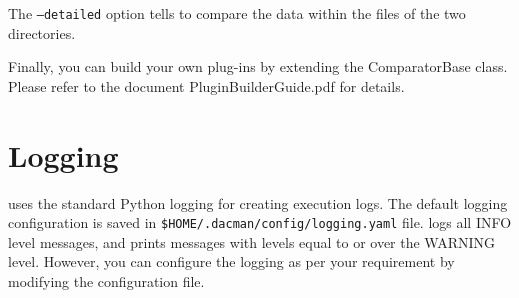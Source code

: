 The \texttt{--detailed} option tells \systemname to compare the data
within the files of the two directories.

Finally, you can build your own plug-ins by extending the ComparatorBase
class. Please refer to the document PluginBuilderGuide.pdf for details. 

\section{Logging}
\systemname uses the standard Python logging for creating execution
logs. The default logging configuration is saved in \texttt{\$HOME/.dacman/config/logging.yaml}
file. \systemname logs all INFO level messages, and prints
messages with levels equal to or over the WARNING level. However,
you can configure the logging as per your requirement by modifying the
configuration file. 
